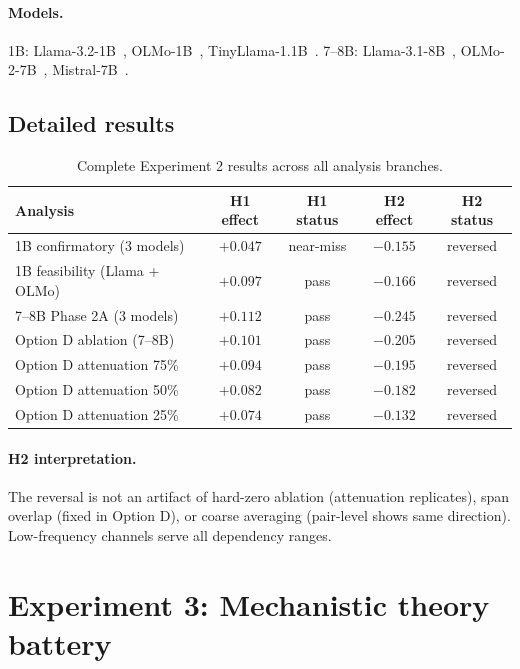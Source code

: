 \documentclass{article}
\begin{document}
\paragraph{Models.} 1B: Llama-3.2-1B~\citep{dubey2024llama3},
OLMo-1B~\citep{groeneveld2024olmo}, TinyLlama-1.1B~\citep{zhang2024tinyllama}.
7--8B: Llama-3.1-8B~\citep{dubey2024llama3}, OLMo-2-7B~\citep{groeneveld2024olmo},
Mistral-7B~\citep{jiang2023mistral}.

\subsection{Detailed results}

\begin{table}[htbp]
    \caption{Complete Experiment 2 results across all analysis branches.}
    \centering
    \small
    \begin{tabular}{lcccc}
        \toprule
        Analysis & H1 effect & H1 status & H2 effect & H2 status \\
        \midrule
        1B confirmatory (3 models) & $+0.047$ & near-miss & $-0.155$ & reversed \\
        1B feasibility (Llama + OLMo) & $+0.097$ & pass & $-0.166$ & reversed \\
        7--8B Phase 2A (3 models) & $+0.112$ & pass & $-0.245$ & reversed \\
        Option D ablation (7--8B) & $+0.101$ & pass & $-0.205$ & reversed \\
        Option D attenuation 75\% & $+0.094$ & pass & $-0.195$ & reversed \\
        Option D attenuation 50\% & $+0.082$ & pass & $-0.182$ & reversed \\
        Option D attenuation 25\% & $+0.074$ & pass & $-0.132$ & reversed \\
        \bottomrule
    \end{tabular}
\end{table}

\paragraph{H2 interpretation.} The reversal is not an artifact of hard-zero ablation
(attenuation replicates), span overlap (fixed in Option D), or coarse averaging (pair-level
shows same direction). Low-frequency channels serve all dependency ranges.

\section{Experiment 3: Mechanistic theory battery}
\label{app:exp3}
\end{document}
